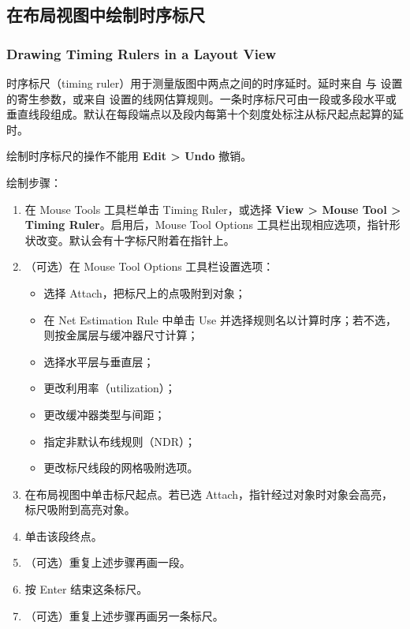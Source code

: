\subsection{在布局视图中绘制时序标尺}
\subsubsection*{Drawing Timing Rulers in a Layout View}

时序标尺（timing ruler）用于测量版图中两点之间的时序延时。延时来自  与  设置的寄生参数，或来自  设置的线网估算规则。一条时序标尺可由一段或多段水平或垂直线段组成。默认在每段端点以及段内每第十个刻度处标注从标尺起点起算的延时。

\begin{noteBox}
绘制时序标尺的操作不能用 \textbf{Edit > Undo} 撤销。
\end{noteBox}

绘制步骤：
\begin{enumerate}
  \item 在 Mouse Tools 工具栏单击 Timing Ruler，或选择 \textbf{View > Mouse Tool > Timing Ruler}。启用后，Mouse Tool Options 工具栏出现相应选项，指针形状改变。默认会有十字标尺附着在指针上。
  \item （可选）在 Mouse Tool Options 工具栏设置选项：
  \begin{itemize}
    \item 选择 Attach，把标尺上的点吸附到对象；
    \item 在 Net Estimation Rule 中单击 Use 并选择规则名以计算时序；若不选，则按金属层与缓冲器尺寸计算；
    \item 选择水平层与垂直层；
    \item 更改利用率（utilization）；
    \item 更改缓冲器类型与间距；
    \item 指定非默认布线规则（NDR）；
    \item 更改标尺线段的网格吸附选项。
  \end{itemize}
  \item 在布局视图中单击标尺起点。若已选 Attach，指针经过对象时对象会高亮，标尺吸附到高亮对象。
  \item 单击该段终点。
  \item （可选）重复上述步骤再画一段。
  \item 按 Enter 结束这条标尺。
  \item （可选）重复上述步骤再画另一条标尺。
\end{enumerate}

